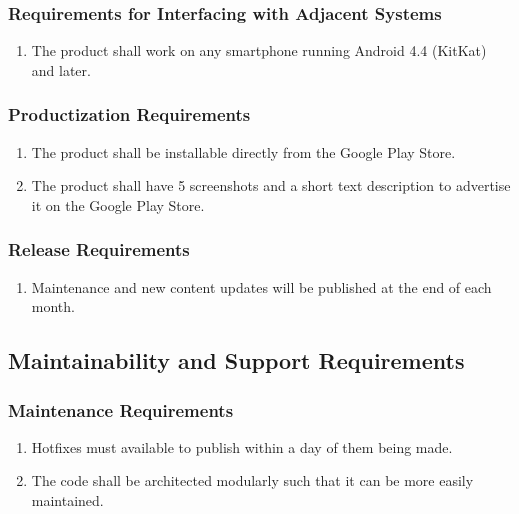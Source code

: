 \documentclass[]{article}
\begin{document}
\subsubsection{Requirements for Interfacing with Adjacent Systems}
\label{ssub:requirements_for_interfacing_with_adjacent_systems}
\begin{enumerate}[{OE}1. ]
	\resumeEnum
	\item The product shall work on any smartphone running Android 4.4 (KitKat) and later.
	\holdEnum
\end{enumerate}

\subsubsection{Productization Requirements}
\label{ssub:productization_requirements}
\begin{enumerate}[{OE}1. ]
	\resumeEnum
	\item The product shall be installable directly from the Google Play Store.
	\item The product shall have 5 screenshots and a short text description to advertise it on the Google Play Store.
	\holdEnum
\end{enumerate}

\subsubsection{Release Requirements}
\label{ssub:release_requirements}
\begin{enumerate}[{OE}1. ]
	\resumeEnum
	\item Maintenance and new content updates will be published at the end of each month.
	\holdEnum
\end{enumerate}


\subsection{Maintainability and Support Requirements}
\label{sub:maintainability_and_support_requirements}

\subsubsection{Maintenance Requirements}
\label{ssub:maintenance_requirements}
\begin{enumerate}[{MS}1. ]
	\item Hotfixes must available to publish within a day of them being made.
	\item The code shall be architected modularly such that it can be more easily maintained.
	\holdEnum
\end{enumerate}
\end{document}
